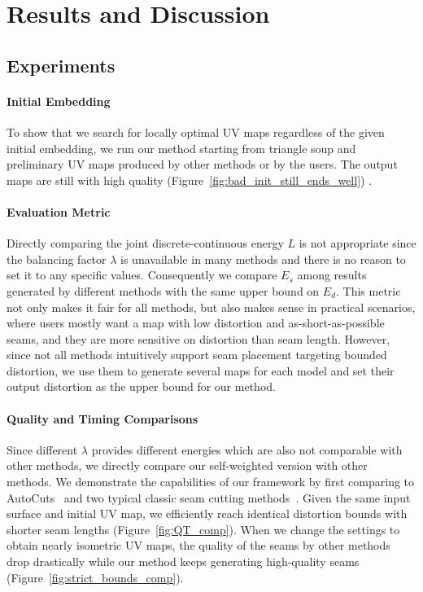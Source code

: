 
\section{Results and Discussion}
\label{sec:results}

\subsection{Experiments}
\label{sec:results_exp}

\paragraph{Initial Embedding} 

To show that we search for locally optimal UV maps regardless of the given initial embedding, we run our method starting from triangle soup and preliminary UV maps produced by other methods or by the users. The output maps are still with high quality (Figure~\ref{fig:bad_init_still_ends_well}) \minchen{[TODO]}.

\paragraph{Evaluation Metric} Directly comparing the joint discrete-continuous energy $L$ is not appropriate since the balancing factor $\lambda$ is unavailable in many methods and there is no reason to set it to any specific values. Consequently we compare $E_s$ among results generated by different methods with the same upper bound on $E_d$. This metric not only makes it fair for all methods, but also makes sense in practical scenarios, where users mostly want a map with low distortion and as-short-as-possible seams, and they are more sensitive on distortion than seam length. However, since not all methods intuitively support seam placement targeting bounded distortion, we use them to generate several maps for each model and set their output distortion as the upper bound for our method.

\paragraph{Quality and Timing Comparisons}  Since different $\lambda$ provides different energies which are also not comparable with other methods, we directly compare our self-weighted version with other methods. We demonstrate the capabilities of our framework by first comparing to AutoCuts~\cite{Poranne2017Autocuts} and two typical classic seam cutting methods~\cite{Gu2002Geometry,Sheffer2002Seamster}. Given the same input surface and initial UV map, we efficiently reach identical distortion bounds with shorter seam lengths (Figure~\ref{fig:QT_comp}). 
When we change the settings to obtain nearly isometric UV maps, the quality of the seams by other methods drop drastically while our method keeps generating high-quality seams (Figure~\ref{fig:strict_bounds_comp}).

